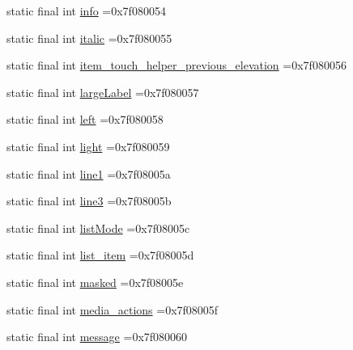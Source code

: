 \begin{DoxyCompactItemize}
\item 
static final int \mbox{\hyperlink{classbr_1_1unb_1_1cic_1_1mp_1_1marketmaster_1_1test_1_1R_1_1id_aa41a13bc8998d8232bdf4abbd763988b}{info}} =0x7f080054
\item 
static final int \mbox{\hyperlink{classbr_1_1unb_1_1cic_1_1mp_1_1marketmaster_1_1test_1_1R_1_1id_a796746dc8cce144571436eae433080ea}{italic}} =0x7f080055
\item 
static final int \mbox{\hyperlink{classbr_1_1unb_1_1cic_1_1mp_1_1marketmaster_1_1test_1_1R_1_1id_af264f52e197fa6ae5ec83f2bb2c50f8e}{item\+\_\+touch\+\_\+helper\+\_\+previous\+\_\+elevation}} =0x7f080056
\item 
static final int \mbox{\hyperlink{classbr_1_1unb_1_1cic_1_1mp_1_1marketmaster_1_1test_1_1R_1_1id_a48262efec3a367de72fea6cd9798f216}{large\+Label}} =0x7f080057
\item 
static final int \mbox{\hyperlink{classbr_1_1unb_1_1cic_1_1mp_1_1marketmaster_1_1test_1_1R_1_1id_a4885a60157dfad09435a98fc33ecaf09}{left}} =0x7f080058
\item 
static final int \mbox{\hyperlink{classbr_1_1unb_1_1cic_1_1mp_1_1marketmaster_1_1test_1_1R_1_1id_a060e77a5c42ad0a47abbe4e4866af2c0}{light}} =0x7f080059
\item 
static final int \mbox{\hyperlink{classbr_1_1unb_1_1cic_1_1mp_1_1marketmaster_1_1test_1_1R_1_1id_a33fa4a8b7df37aefa15707940aedcbcd}{line1}} =0x7f08005a
\item 
static final int \mbox{\hyperlink{classbr_1_1unb_1_1cic_1_1mp_1_1marketmaster_1_1test_1_1R_1_1id_a150468649e54d3a434faec3d105efa6a}{line3}} =0x7f08005b
\item 
static final int \mbox{\hyperlink{classbr_1_1unb_1_1cic_1_1mp_1_1marketmaster_1_1test_1_1R_1_1id_ace598bbd0d7631f5903f981ae995a192}{list\+Mode}} =0x7f08005c
\item 
static final int \mbox{\hyperlink{classbr_1_1unb_1_1cic_1_1mp_1_1marketmaster_1_1test_1_1R_1_1id_a29545f17594b25e7d1d03ef15929ee39}{list\+\_\+item}} =0x7f08005d
\item 
static final int \mbox{\hyperlink{classbr_1_1unb_1_1cic_1_1mp_1_1marketmaster_1_1test_1_1R_1_1id_a5e232f34049d7f0e04efe9bff3fc8643}{masked}} =0x7f08005e
\item 
static final int \mbox{\hyperlink{classbr_1_1unb_1_1cic_1_1mp_1_1marketmaster_1_1test_1_1R_1_1id_aeff77ce60c40712cd899c74839d80136}{media\+\_\+actions}} =0x7f08005f
\item 
static final int \mbox{\hyperlink{classbr_1_1unb_1_1cic_1_1mp_1_1marketmaster_1_1test_1_1R_1_1id_ab4f55de3290d4325e8746947485775ba}{message}} =0x7f080060

\end{DoxyCompactItemize}
